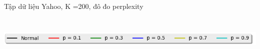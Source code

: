 \documentclass[pdf]{beamer}
\begin{document}
\begin{frame}{Tập dữ liệu Yahoo, K =200, đô đo perplexity}
\begin{columns}[T] %
\begin{column}{.50\textwidth}
\begin{figure}
\end{figure}
\end{column} %
\hfill%
\begin{column}{.50\textwidth}
\begin{figure}
\end{figure}				
\end{column} %
\end{columns}
\begin{center}
\includegraphics[width=1\textwidth]{menu.png}	
\end{center}
\end{frame}
\end{document}
